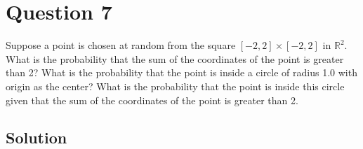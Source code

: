 \section*{Question 7}

Suppose a point is chosen at random from the square \( [-2, 2] \times [-2, 2]\) in \( \mathbb{R}^2 \).
What is the probability that the sum of the coordinates of the point is greater than 2?
What is the probability that the point is inside a circle of radius 1.0 with origin as the center?
What is the probability that the point is inside this circle given that the sum of the coordinates of the point is greater than 2.

\subsection*{Solution}
